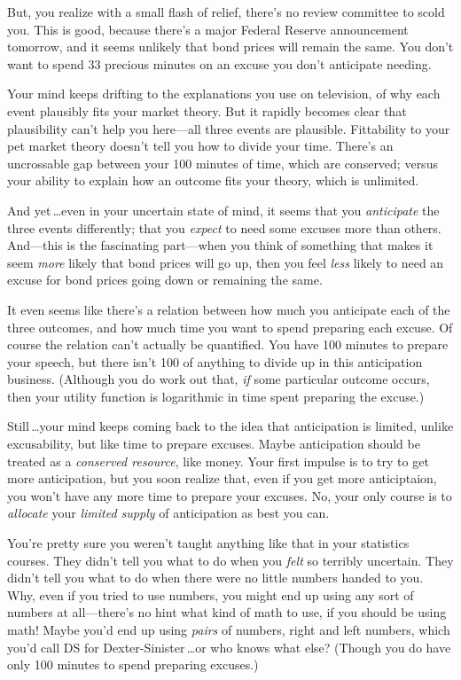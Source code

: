 {
 But, you realize with a small flash of relief,
there's no review committee to scold you. This is good,
because there's a major Federal Reserve announcement
tomorrow, and it seems unlikely that bond prices will remain the same.
You don't want to spend 33 precious minutes on an
excuse you don't anticipate needing.}

{
 Your mind keeps drifting to the explanations you use on
television, of why each event plausibly fits your market theory. But it
rapidly becomes clear that plausibility can't help you
here---all three events are plausible. Fittability to your pet market
theory doesn't tell you how to divide your time.
There's an uncrossable gap between your 100 minutes of
time, which are conserved; versus your ability to explain how an
outcome fits your theory, which is unlimited.}

{
 And yet\,\ldots even in your uncertain state of mind, it seems that
you \textit{anticipate} the three events differently; that you
\textit{expect} to need some excuses more than others. And---this is
the fascinating part---when you think of something that makes it seem
\textit{more} likely that bond prices will go up, then you feel
\textit{less} likely to need an excuse for bond prices going down or
remaining the same.}

{
 It even seems like there's a relation between how
much you anticipate each of the three outcomes, and how much time you
want to spend preparing each excuse. Of course the relation
can't actually be quantified. You have 100 minutes to
prepare your speech, but there isn't 100 of anything to
divide up in this anticipation business. (Although you do work out
that, \textit{if} some particular outcome occurs, then your utility
function is logarithmic in time spent preparing the excuse.)}

{
 Still\,\ldots your mind keeps coming back to the idea that
anticipation is limited, unlike excusability, but like time to prepare
excuses. Maybe anticipation should be treated as a \textit{conserved
resource}, like money. Your first impulse is to try to get more
anticipation, but you soon realize that, even if you get more
anticiptaion, you won't have any more time to prepare
your excuses. No, your only course is to \textit{allocate} your
\textit{limited supply} of anticipation as best you can.}

{
 You're pretty sure you weren't
taught anything like that in your statistics courses. They
didn't tell you what to do when you \textit{felt} so
terribly uncertain. They didn't tell you what to do
when there were no little numbers handed to you. Why, even if you tried
to use numbers, you might end up using any sort of numbers at
all---there's no hint what kind of math to use, if you
should be using math! Maybe you'd end up using
\textit{pairs} of numbers, right and left numbers, which
you'd call DS for Dexter-Sinister\,\ldots or who knows
what else? (Though you do have only 100 minutes to spend preparing
excuses.)}

